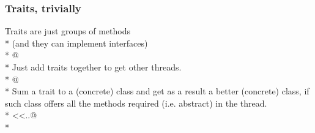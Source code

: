 \begin{frame}[fragile]
\frametitle{Traits, trivially}
Traits are just groups of methods
\\*
(and they can implement interfaces)
\\*
@
\\*
Just add traits together to get other threads.
\\*
@
\\*
Sum a trait to a (concrete) class and get
as a result a better (concrete) class, if such class offers all
the methods required (i.e. abstract) in the thread.
\\*
<<{..}@
\\*


\end{frame}


